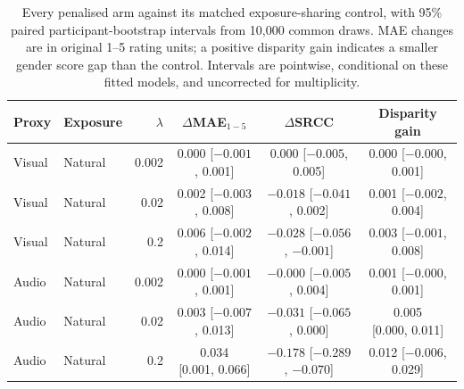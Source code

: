 \begin{table}[htbp]
\centering
\caption[Matched AVI penalty contrasts]{Every penalised arm against its matched
exposure-sharing control, with 95\% paired participant-bootstrap intervals from 10{,}000
common draws. MAE changes are in original 1--5 rating units; a positive disparity gain
indicates a smaller gender score gap than the control. Intervals are pointwise, conditional
on these fitted models, and uncorrected for multiplicity.}
\label{tab:avi-compact-effects}
\small
\begin{adjustbox}{max width=\textwidth}
\begin{tabular}{llrccc}
\toprule
Proxy & Exposure & $\lambda$ & $\Delta$MAE$_{1-5}$ & $\Delta$SRCC & Disparity gain \\
\midrule
Visual & Natural & 0.002 & \shortstack{0.000\\{[$-0.001$, 0.001]}} & \shortstack{0.000\\{[$-0.005$, 0.005]}} & \shortstack{0.000\\{[$-0.000$, 0.001]}} \\
Visual & Natural & 0.02 & \shortstack{0.002\\{[$-0.003$, 0.008]}} & \shortstack{$-0.018$\\{[$-0.041$, 0.002]}} & \shortstack{0.001\\{[$-0.002$, 0.004]}} \\
Visual & Natural & 0.2 & \shortstack{0.006\\{[$-0.002$, 0.014]}} & \shortstack{$-0.028$\\{[$-0.056$, $-0.001$]}} & \shortstack{0.003\\{[$-0.001$, 0.008]}} \\
Audio & Natural & 0.002 & \shortstack{0.000\\{[$-0.001$, 0.001]}} & \shortstack{$-0.000$\\{[$-0.005$, 0.004]}} & \shortstack{0.001\\{[$-0.000$, 0.001]}} \\
Audio & Natural & 0.02 & \shortstack{0.003\\{[$-0.007$, 0.013]}} & \shortstack{$-0.031$\\{[$-0.065$, 0.000]}} & \shortstack{0.005\\{[0.000, 0.011]}} \\
Audio & Natural & 0.2 & \shortstack{0.034\\{[0.001, 0.066]}} & \shortstack{$-0.178$\\{[$-0.289$, $-0.070$]}} & \shortstack{0.012\\{[$-0.006$, 0.029]}} \\

\end{tabular}
\end{adjustbox}
\end{table}
